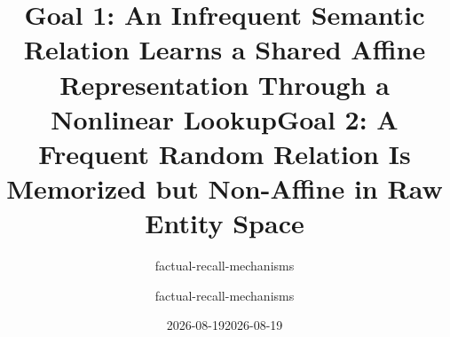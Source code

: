\documentclass[11pt]{article}
\makeatletter
\let\linearwriteupmaketitle\maketitle
\let\linearwriteupatmaketitle\@maketitle
\let\linearwriteuptitle\title
\let\linearwriteupauthor\author
\let\linearwriteupdate\date
\makeatother
\begin{document}
\title{Goal 1: An Infrequent Semantic Relation Learns a Shared Affine Representation Through a Nonlinear Lookup}
\author{factual-recall-mechanisms}
\date{2026-08-19}


\clearpage
\makeatletter
\let\maketitle\linearwriteupmaketitle
\let\@maketitle\linearwriteupatmaketitle
\let\title\linearwriteuptitle
\let\author\linearwriteupauthor
\let\date\linearwriteupdate
\makeatother
\setcounter{section}{0}
\setcounter{subsection}{0}
\setcounter{figure}{0}
\setcounter{table}{0}
\setcounter{equation}{0}
\setcounter{footnote}{0}
\renewcommand{\theHsection}{goal2.\arabic{section}}
\renewcommand{\theHsubsection}{goal2.\arabic{section}.\arabic{subsection}}
\renewcommand{\theHfigure}{goal2.\arabic{figure}}
\renewcommand{\theHtable}{goal2.\arabic{table}}
\let\linearwriteuplabel\label
\let\linearwriteupref\ref
\renewcommand{\label}[1]{\linearwriteuplabel{goal2:#1}}
\renewcommand{\ref}[1]{\linearwriteupref{goal2:#1}}

\title{Goal 2: A Frequent Random Relation Is Memorized but Non-Affine in Raw Entity Space}
\author{factual-recall-mechanisms}
\date{2026-08-19}

\end{document}
